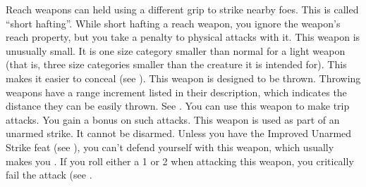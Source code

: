 Reach weapons can held using a different grip to strike nearby foes. This is called ``short hafting''. While short hafting a reach weapon, you ignore the weapon's reach property, but you take a  penalty to physical attacks with it.
 This weapon is unusually small. It is one size category smaller than normal for a light weapon (that is, three size categories smaller than the creature it is intended for). This makes it easier to conceal (see ).
 This weapon is designed to be thrown. Throwing weapons have a range increment listed in their description, which indicates the distance they can be easily thrown. See .
 You can use this weapon to make trip attacks. You gain a  bonus on such attacks.
 This weapon is used as part of an unarmed strike. It cannot be disarmed. Unless you have the Improved Unarmed Strike feat (see ), you can't defend yourself with this weapon, which usually makes you .
 If you roll either a 1 or 2 when attacking this weapon, you critically fail the attack (see .

